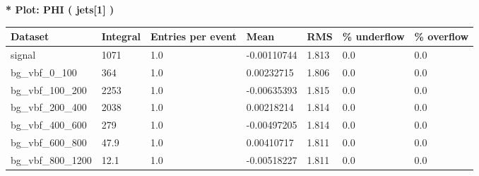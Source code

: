 \documentclass[a4paper, 10pt]{article}
\begin{document}
\textbf{* Plot: PHI ( jets[1] ) }\\
   \begin{table}[H]
  \begin{center}
    \begin{tabular}{|m{23.0mm}|m{23.0mm}|m{18.0mm}|m{19.0mm}|m{19.0mm}|m{19.0mm}|m{19.0mm}|}
      \hline
      {\cellcolor{yellow}         Dataset}& {\cellcolor{yellow}         Integral}& {\cellcolor{yellow}         Entries per event}& {\cellcolor{yellow}         Mean}& {\cellcolor{yellow}         RMS}& {\cellcolor{yellow}         \% underflow}& {\cellcolor{yellow}         \% overflow}\\
      \hline
      {\cellcolor{white}         signal}& {\cellcolor{white}         1071}& {\cellcolor{white}         1.0}& {\cellcolor{white}         -0.00110744}& {\cellcolor{white}         1.813}& {\cellcolor{green}         0.0}& {\cellcolor{green}         0.0}\\
      \hline
      {\cellcolor{white}         bg\_vbf\_0\_100}& {\cellcolor{white}         364}& {\cellcolor{white}         1.0}& {\cellcolor{white}         0.00232715}& {\cellcolor{white}         1.806}& {\cellcolor{green}         0.0}& {\cellcolor{green}         0.0}\\
      \hline
      {\cellcolor{white}         bg\_vbf\_100\_200}& {\cellcolor{white}         2253}& {\cellcolor{white}         1.0}& {\cellcolor{white}         -0.00635393}& {\cellcolor{white}         1.815}& {\cellcolor{green}         0.0}& {\cellcolor{green}         0.0}\\
      \hline
      {\cellcolor{white}         bg\_vbf\_200\_400}& {\cellcolor{white}         2038}& {\cellcolor{white}         1.0}& {\cellcolor{white}         0.00218214}& {\cellcolor{white}         1.814}& {\cellcolor{green}         0.0}& {\cellcolor{green}         0.0}\\
      \hline
      {\cellcolor{white}         bg\_vbf\_400\_600}& {\cellcolor{white}         279}& {\cellcolor{white}         1.0}& {\cellcolor{white}         -0.00497205}& {\cellcolor{white}         1.814}& {\cellcolor{green}         0.0}& {\cellcolor{green}         0.0}\\
      \hline
      {\cellcolor{white}         bg\_vbf\_600\_800}& {\cellcolor{white}         47.9}& {\cellcolor{white}         1.0}& {\cellcolor{white}         0.00410717}& {\cellcolor{white}         1.811}& {\cellcolor{green}         0.0}& {\cellcolor{green}         0.0}\\
      \hline
      {\cellcolor{white}         bg\_vbf\_800\_1200}& {\cellcolor{white}         12.1}& {\cellcolor{white}         1.0}& {\cellcolor{white}         -0.00518227}& {\cellcolor{white}         1.811}& {\cellcolor{green}         0.0}& {\cellcolor{green}         0.0}\\

\end{tabular}
\end{center}
\end{table}
\end{document}
